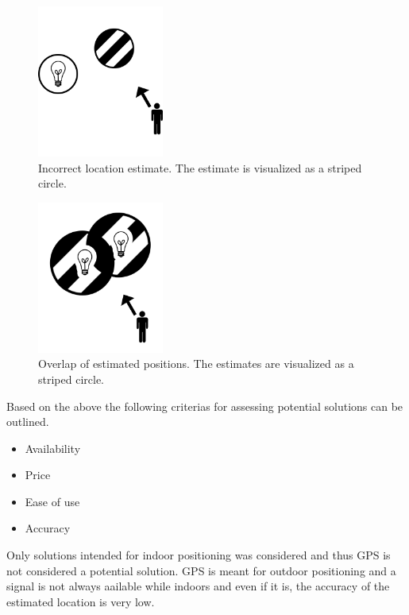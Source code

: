 \begin{figure}[h]
\centering
\includegraphics[height=5cm]{images/incorrect-positioning-estimate.png}
\caption{Incorrect location estimate. The estimate is visualized as a striped circle.}
\label{fig:indoor-positioning:incorrect}
\end{figure}

\begin{figure}[h]
\centering
\includegraphics[height=5cm]{images/positioning-overlap.png}
\caption{Overlap of estimated positions. The estimates are visualized as a striped circle.}
\label{fig:indoor-positioning:overlap}
\end{figure}

Based on the above the following criterias for assessing potential solutions can be outlined.

\begin{itemize}
\item Availability
\item Price
\item Ease of use
\item Accuracy
\end{itemize}

Only solutions intended for indoor positioning was considered and thus GPS is not considered a potential solution. 
GPS is meant for outdoor positioning and a signal is not always aailable while indoors and even if it is, the accuracy of the estimated location is very low.

